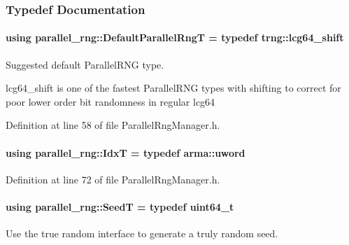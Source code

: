 \subsubsection{Typedef Documentation}
\hypertarget{namespaceparallel__rng_a4cb66b089d51a2a89cf6deac41c9b15f}{
\paragraph[{Default\-Parallel\-Rng\-T}]{\setlength{\rightskip}{0pt plus 5cm}using {\bf parallel\-\_\-rng\-::\-Default\-Parallel\-Rng\-T} = typedef trng\-::lcg64\-\_\-shift}}\label{namespaceparallel__rng_a4cb66b089d51a2a89cf6deac41c9b15f}


Suggested default Parallel\-R\-N\-G type. 

lcg64\-\_\-shift is one of the fastest Parallel\-R\-N\-G types with shifting to correct for poor lower order bit randomness in regular lcg64 

Definition at line 58 of file Parallel\-Rng\-Manager.\-h.

\hypertarget{namespaceparallel__rng_aa22fa3e339aee5927780aac099dfc6f3}{
\paragraph[{Idx\-T}]{\setlength{\rightskip}{0pt plus 5cm}using {\bf parallel\-\_\-rng\-::\-Idx\-T} = typedef arma\-::uword}}\label{namespaceparallel__rng_aa22fa3e339aee5927780aac099dfc6f3}


Definition at line 72 of file Parallel\-Rng\-Manager.\-h.

\hypertarget{namespaceparallel__rng_a462b8721a1aabe3b86582e864640c707}{
\paragraph[{Seed\-T}]{\setlength{\rightskip}{0pt plus 5cm}using {\bf parallel\-\_\-rng\-::\-Seed\-T} = typedef uint64\-\_\-t}}\label{namespaceparallel__rng_a462b8721a1aabe3b86582e864640c707}


Use the true random interface to generate a truly random seed. 



